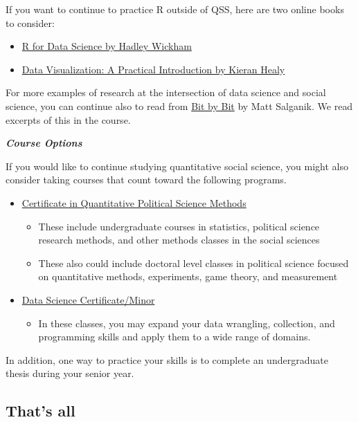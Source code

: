 \documentclass[
  letterpaper,
  DIV=11,
  numbers=noendperiod]{scrreprt}
\providecommand{\tightlist}{%
  \setlength{\itemsep}{0pt}\setlength{\parskip}{0pt}}\usepackage{longtable,booktabs,array}
\begin{document}
If you want to continue to practice R outside of QSS, here are two
online books to consider:

\begin{itemize}
\tightlist
\item
  \href{https://r4ds.had.co.nz/}{R for Data Science by Hadley Wickham}
\item
  \href{https://socviz.co/}{Data Visualization: A Practical Introduction
  by Kieran Healy}
\end{itemize}

For more examples of research at the intersection of data science and
social science, you can continue also to read from
\href{https://www.bitbybitbook.com/en/1st-ed/preface/}{Bit by Bit} by
Matt Salganik. We read excerpts of this in the course.

\textbf{\emph{Course Options}}

If you would like to continue studying quantitative social science, you
might also consider taking courses that count toward the following
programs.

\begin{itemize}
\tightlist
\item
  \href{https://www.polisci.rutgers.edu/academics/undergraduate/certificates/59-undergraduate/undergraduate-program/173-quantitative-polisci-certificate}{Certificate
  in Quantitative Political Science Methods}

  \begin{itemize}
  \tightlist
  \item
    These include undergraduate courses in statistics, political science
    research methods, and other methods classes in the social sciences
  \item
    These also could include doctoral level classes in political science
    focused on quantitative methods, experiments, game theory, and
    measurement
  \end{itemize}
\item
  \href{https://mps.rutgers.edu/data-science-program/data-science-program-undergraduate-certificate}{Data
  Science Certificate/Minor}

  \begin{itemize}
  \tightlist
  \item
    In these classes, you may expand your data wrangling, collection,
    and programming skills and apply them to a wide range of domains.
  \end{itemize}
\end{itemize}

In addition, one way to practice your skills is to complete an
undergraduate thesis during your senior year.

\hypertarget{thats-all}{%
\subsection{That's all}\label{thats-all}}
\end{document}
